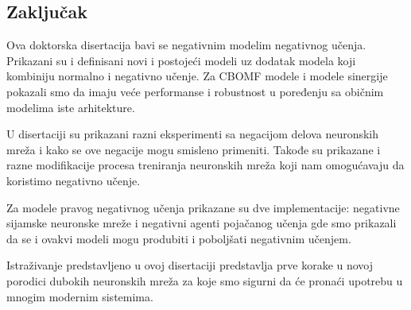 \subsection*{Zaključak}

Ova doktorska disertacija bavi se negativnim modelim negativnog učenja. Prikazani su i definisani novi i postojeći modeli uz dodatak modela koji kombiniju normalno i negativno učenje. Za CBOMF modele i modele sinergije pokazali smo da imaju veće performanse i robustnost u poređenju sa običnim modelima iste arhitekture.

U disertaciji su prikazani razni eksperimenti sa negacijom delova neuronskih mreža i kako se ove negacije mogu smisleno primeniti. Takođe su prikazane i razne modifikacije procesa treniranja neuronskih mreža koji nam omogućavaju da koristimo negativno učenje.

Za modele pravog negativnog učenja prikazane su dve implementacije: negativne sijamske neuronske mreže i negativni agenti pojačanog učenja gde smo prikazali da se i ovakvi modeli mogu produbiti i poboljšati negativnim učenjem.

Istraživanje predstavljeno u ovoj disertaciji predstavlja prve korake u novoj porodici dubokih neuronskih mreža za koje smo sigurni da će pronaći upotrebu u mnogim modernim sistemima.


